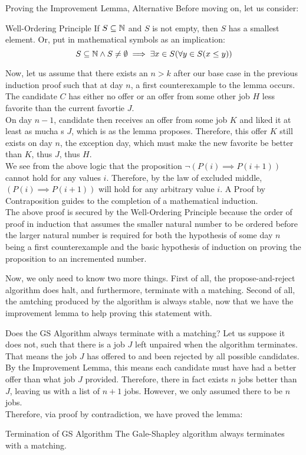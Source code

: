 \begin{ln-think}{Proving the Improvement Lemma, Alternative}{}
    Before moving on, let us consider:
    \begin{ln-define}{Well-Ordering Principle}{}
        If $S \subseteq \mathbb{N}$ and $S$ is not empty, then $S$ has a smallest element. Or, put in mathematical symbols as an implication:
        \[S \subseteq \mathbb{N} \land S \neq \emptyset \implies \exists x \in S (\forall y \in S (x \leq y))\]
    \end{ln-define}
    Now, let us assume that there exists an $n > k$ after our base case in the previous induction proof such that at day $n$, a first counterexample to the lemma occurs. The candidate $C$ has either no offer or an offer from some other job $H$ less favorite than the current favortie $J$. \\
    On day $n - 1$, candidate then receives an offer from some job $K$ and liked it at least as mucha s $J$, which is as the lemma proposes. Therefore, this offer $K$ still exists on day $n$, the exception day, which must make the new favorite be better than $K$, thus $J$, thus $H$. \\
    We see from the above logic that the proposition $\neg (P(i) \implies P(i + 1))$ cannot hold for any values $i$. Therefore, by the law of excluded middle, $(P(i) \implies P(i + 1))$ will hold for any arbitrary value $i$. A Proof by Contraposition guides to the completion of a mathematical induction. \\
    The above proof is secured by the Well-Ordering Principle because the order of proof in induction that assumes the smaller natural number to be ordered before the larger natural number is required for both the hypothesis of some day $n$ being a first counterexample and the basic hypothesis of induction on proving the proposition to an incremented number.
\end{ln-think}
Now, we only need to know two more things. First of all, the propose-and-reject algorithm does halt, and furthermore, terminate with a matching. Second of all, the amtching produced by the algorithm is always stable, now that we have the improvement lemma to help proving this statement with.
\begin{ln-think}{Does the GS Algorithm always terminate with a matching?}{}
    Let us suppose it does not, such that there is a job $J$ left unpaired when the algorithm terminates. That means the job $J$ has offered to and been rejected by all possible candidates. \\
    By the Improvement Lemma, this means each candidate must have had a better offer than what job $J$ provided. Therefore, there in fact exists $n$ jobs better than $J$, leaving us with a list of $n + 1$ jobs. However, we only assumed there to be $n$ jobs. \\
    Therefore, via proof by contradiction, we have proved the lemma:
    \begin{ln-lemma}{Termination of GS Algorithm}{}
        The Gale-Shapley algorithm always terminates with a matching.
    \end{ln-lemma}
\end{ln-think}
